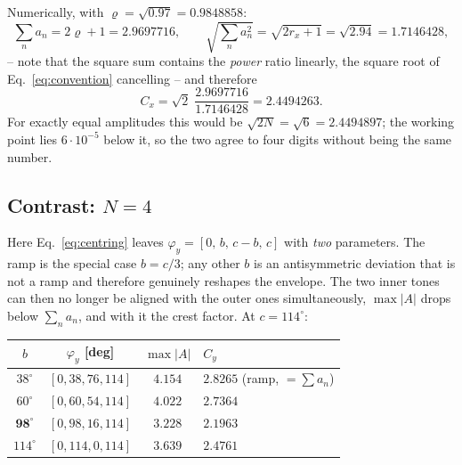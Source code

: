 \documentclass[11pt,a4paper]{article}
\newcommand{\crest}{\ensuremath{C}}
\begin{document}
\medskip
\noindent{}

\medskip
\noindent Numerically, with $\varrho=\sqrt{0.97}=0.9848858$:
\begin{equation}
  \sum_n a_n = 2\varrho+1 = 2.9697716 ,
  \qquad
  \sqrt{\textstyle\sum_n a_n^2} = \sqrt{2r_x+1} = \sqrt{2.94} = 1.7146428 ,
\end{equation}
-- note that the square sum contains the \emph{power} ratio linearly, the
square root of Eq.~\eqref{eq:convention} cancelling -- and therefore
\begin{equation}
  \crest_x = \sqrt2\;\frac{2.9697716}{1.7146428} = 2.4494263 .
\end{equation}
For exactly equal amplitudes this would be $\sqrt{2N}=\sqrt6 = 2.4494897$;
the working point lies $6\cdot10^{-5}$ below it, so the two agree to four
digits without being the same number.

\subsection{Contrast: \boldmath$N=4$}

Here Eq.~\eqref{eq:centring} leaves $\varphi_y = [0,\,b,\,c-b,\,c]$ with
\emph{two} parameters. The ramp is the special case $b=c/3$; any other $b$ is
an antisymmetric deviation that is not a ramp and therefore genuinely
reshapes the envelope. The two inner tones can then no longer be aligned with
the outer ones simultaneously, $\max|A|$ drops below $\sum_n a_n$, and with
it the crest factor. At $c=114^\circ$:

\begin{center}
\begin{tabular}{cccl}
  \toprule
  $b$ & $\varphi_y$ [deg] & $\max|A|$ & $\crest_y$\\
  \midrule
  $38^\circ$ & $[0,38,76,114]$ & $4.154$ & $2.8265$ \quad(ramp, $=\sum a_n$)\\
  $60^\circ$ & $[0,60,54,114]$ & $4.022$ & $2.7364$\\
  $\mathbf{98^\circ}$ & $[0,98,16,114]$ & $\mathbf{3.228}$ & $\mathbf{2.1963}$\\
  $114^\circ$ & $[0,114,0,114]$ & $3.639$ & $2.4761$\\
  \bottomrule
\end{tabular}
\end{center}
\end{document}
